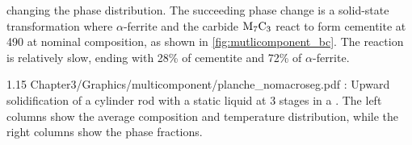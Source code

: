 changing the phase distribution. The succeeding phase change is a solid-state transformation where $\alpha$-ferrite and the carbide $\text{M}_7 \text{C}_3$ react to form 
cementite at \SI{490}{\udegC} at nominal composition, as shown in \cref{fig:mutlicomponent_bc}. The reaction is relatively slow, ending with 28\% 
of cementite and 72\% of $\alpha$-ferrite.
%
\begin{landscape}
\begin{figureth}
{1.15}
{Chapter3/Graphics/multicomponent/planche_nomacroseg.pdf}
{: Upward solidification of a cylinder rod with a static liquid at 
3 stages in a . The left columns show the average 
composition and temperature distribution, while the right columns show the phase fractions.}
\label{fig:planche_nomacroseg}
\end{figureth}
\end{landscape}
%